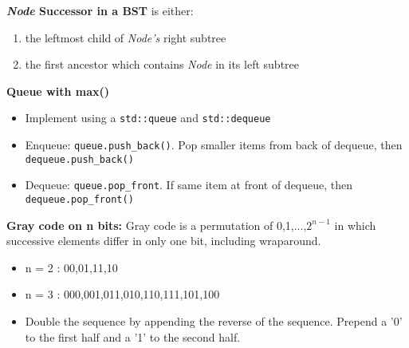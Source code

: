 \documentclass[12pt]{article}
\begin{document}
\vspace{5mm}
\noindent
\textbf{\emph{Node} Successor in a BST} is either:
\begin{enumerate}
\item the leftmost child of \emph{Node's} right subtree
\item the first ancestor which contains \emph{Node} in its left subtree
\end{enumerate}


\vspace{5mm}
\noindent
\textbf{Queue with max()}
\begin{itemize}
\item Implement using a \texttt{std::queue} and \texttt{std::dequeue}
\item Enqueue: \texttt{queue.push\_back()}. Pop smaller items from back of dequeue, then \texttt{dequeue.push\_back()}
\item Dequeue: \texttt{queue.pop\_front}. If same item at front of dequeue, then \texttt{dequeue.pop\_front()}
\end{itemize}


\vspace{5mm}
\noindent
\textbf{Gray code on n bits:} Gray code is a permutation of 0,1,...,$2^{n-1}$ in which successive elements differ in only one bit, including wraparound.
\begin{itemize}
\item n = 2 : 00,01,11,10
\item n = 3 : 000,001,011,010,110,111,101,100
\item Double the sequence by appending the reverse of the sequence. Prepend a '0' to the first half and a '1' to the second half.
\end{itemize}
\end{document}
